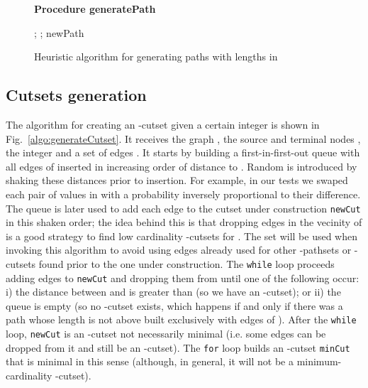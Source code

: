 \documentclass[a4paper]{article}
\begin{document}
\begin{figure}
\textbf{Procedure generatePath}
\begin{center}
\begin{algorithmic}[1]
\STATE ; ; 
\WHILE {}
	\STATE 
	\STATE 
	\IF {}
		\RETURN 
	\ELSE
		\IF {}
			\STATE  
		\ELSE
			\STATE 
		\ENDIF
		\STATE 
		\STATE 
		\STATE 
		\STATE 
	\ENDIF
\ENDWHILE
\RETURN newPath
\end{algorithmic}
\end{center}
\caption{Heuristic algorithm for generating paths with lengths in }
\label{algo:generatePath}
\end{figure}

\subsection{Cutsets generation}

The algorithm for creating an -cutset given a certain integer  is shown in Fig.~\ref{algo:generateCutset}. It  receives the graph , the source and terminal nodes , the integer  and a set of edges . It starts by building a first-in-first-out queue with all edges of  inserted in increasing order of distance to . Random is introduced by shaking these distances prior to insertion. For example, in our tests we swaped each pair of values in  with a probability inversely proportional to their difference. The queue is later used to add each edge to the cutset under construction {\tt newCut} in this shaken order; the idea behind this is that dropping edges in the vecinity of  is a good strategy to find low cardinality -cutsets for . The set  will be used when invoking this algorithm  to avoid using edges already used for other -pathsets or -cutsets found prior to the one under construction. The {\tt while} loop proceeds adding edges to {\tt newCut} and dropping them from  until one of the following occur: i) the distance between  and  is greater than  (so we have an -cutset); or ii) the queue is empty (so no -cutset exists, which happens if and only if there was a path whose length is not above  built exclusively with edges of ). After the {\tt while} loop, {\tt newCut} is an -cutset not necessarily minimal (i.e. some edges can be dropped from it and still be an -cutset). The {\tt for} loop builds an -cutset {\tt minCut} that is minimal in this sense (although, in general, it will not be a minimum-cardinality -cutset).
\end{document}
